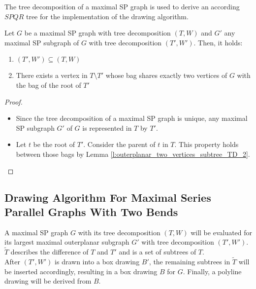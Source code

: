The tree decomposition of a maximal SP graph is used to derive an according $SPQR$ tree for the implementation of the drawing algorithm.

\begin{lemma}
	Let $G$ be a maximal SP graph with tree decomposition $(T,W)$ and $G'$ any maximal SP subgraph of $G$ with tree decomposition $(T',W')$. Then, it holds:
	\begin{enumerate}
		\item $(T',W') \subseteq (T,W)$
		\item There exists a vertex in $T\setminus T'$ whose bag shares exactly two vertices of $G$ with the bag of the root of $T'$
	\end{enumerate}
\end{lemma}
\begin{proof}
	\begin{itemize}
		\item Since the tree decomposition of a maximal SP graph is unique, any maximal SP subgraph $G'$ of $G$ is represented in $T$ by $T'$.
		\item Let $t$ be the root of $T'$. Consider the parent of $t$ in $T$. This property holds between those bags by Lemma \ref{l:outerplanar_two_vertices_subtree_TD_2}.
	\end{itemize}
\end{proof}


\subsection{Drawing Algorithm For Maximal Series Parallel Graphs With Two Bends}

A maximal SP graph $G$ with its tree decomposition $(T,W)$ will be evaluated for its largest maximal outerplanar subgraph $G'$ with tree decomposition $(T',W')$. $\tilde{T}$ describes the difference of $T$ and $T'$ and is a set of subtrees of $T$.\\
After $(T',W')$ is drawn into a box drawing $B'$, the remaining subtrees in $\tilde{T}$ will be inserted accordingly, resulting in a box drawing $B$ for $G$. Finally, a polyline drawing will be derived from $B$.

